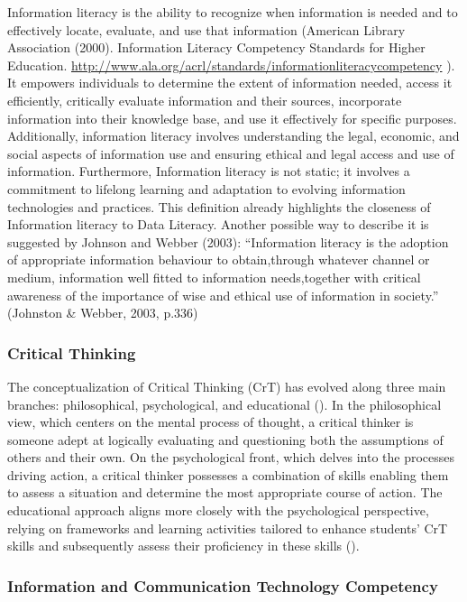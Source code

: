\documentclass[
  12pt,
  a4paper,
  twoside]{article}
\begin{document}
Information literacy is the ability to recognize when information is
needed and to effectively locate, evaluate, and use that information
(American Library Association (2000). Information Literacy Competency
Standards for Higher Education.
\url{http://www.ala.org/acrl/standards/informationliteracycompetency} ).
It empowers individuals to determine the extent of information needed,
access it efficiently, critically evaluate information and their
sources, incorporate information into their knowledge base, and use it
effectively for specific purposes. Additionally, information literacy
involves understanding the legal, economic, and social aspects of
information use and ensuring ethical and legal access and use of
information. Furthermore, Information literacy is not static; it
involves a commitment to lifelong learning and adaptation to evolving
information technologies and practices. This definition already
highlights the closeness of Information literacy to Data Literacy.
Another possible way to describe it is suggested by Johnson and Webber
(2003): ``Information literacy is the adoption of appropriate
information behaviour to obtain,through whatever channel or medium,
information well fitted to information needs,together with critical
awareness of the importance of wise and ethical use of information in
society.'' (Johnston \& Webber, 2003, p.336)

\subsubsection{Critical Thinking}\label{critical-thinking}

The conceptualization of Critical Thinking (CrT) has evolved along three
main branches: philosophical, psychological, and educational
(). In the philosophical view, which
centers on the mental process of thought, a critical thinker is someone
adept at logically evaluating and questioning both the assumptions of
others and their own. On the psychological front, which delves into the
processes driving action, a critical thinker possesses a combination of
skills enabling them to assess a situation and determine the most
appropriate course of action. The educational approach aligns more
closely with the psychological perspective, relying on frameworks and
learning activities tailored to enhance students' CrT skills and
subsequently assess their proficiency in these skills
().

\subsubsection{Information and Communication Technology
Competency}\label{information-and-communication-technology-competency}
\end{document}
